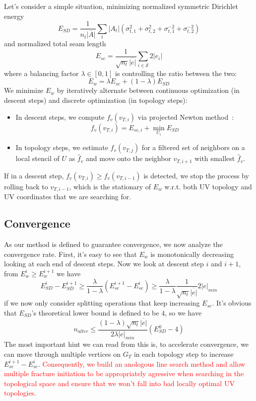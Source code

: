 Let's consider a simple situation, minimizing normalized symmetric Dirichlet energy~\cite{Smith2015Bijective}
\[ E_{SD} = \frac{1}{n_t \overline{|A|}} \sum_t |A_t|(\sigma_{t,1}^2 + \sigma_{t,2}^2 + \sigma_{t,1}^{-2} + \sigma_{t,2}^{-2}) \]
and normalized total seam length
\[ E_{se} = \frac{1}{\sqrt{n_t}\overline{|e|}} \sum_{i \in \mathcal{S}} 2|e_i| \]
where a balancing factor $\lambda \in [0, 1]$ is controlling the ratio between the two: 
\[ E_w = \lambda E_{se} + (1 - \lambda) E_{SD} \]
We minimize $E_w$ by iteratively alternate between continuous optimization (in descent steps) and discrete optimization (in topology steps):
\begin{itemize}
\item In descent steps, we compute $f_v(v_{T,i})$ via projected Newton method~\cite{Teran2005Robust}:
\[ f_v(v_{T,i}) = E_{se,i} + \min_{U_i} E_{SD} \]
\item In topology steps, we estimate $f_v(v_{T,j})$ for a filtered set of neighbors on a local stencil of $U$ as $\hat{f}_v$ and move onto the neighbor $v_{T,i+1}$ with smallest $\hat{f}_v$.
\end{itemize}
If in a descent step, $f_v(v_{T,i}) \geq f_v(v_{T,i-1})$ is detected, we stop the process by rolling back to $v_{T,i-1}$, which is the stationary of $E_w$ w.r.t. both UV topology and UV coordinates that we are searching for.

\subsection{Convergence}

As our method is defined to guarantee convergence, we now analyze the convergence rate. First, it's easy to see that $E_w$ is monotonically decreasing looking at each end of descent steps. Now we look at descent step $i$ and $i+1$, from $E^i_w \geq E^{i+1}_w$ we have
\[ E^i_{SD} - E^{i+1}_{SD} \geq \frac{\lambda}{1-\lambda} (E^{i+1}_{se} - E^i_{se}) \geq \frac{\lambda}{1-\lambda} \frac{1}{\sqrt{n_t}\overline{|e|}} 2|e|_{min} \]
if we now only consider splitting operations that keep increasing $E_{se}$. It's obvious that $E_{SD}$'s theoretical lower bound is defined to be $4$, so we have
\[ n_{alter} \leq \frac{(1-\lambda)\sqrt{n_t}\overline{|e|}}{2\lambda|e|_{min}} (E^0_{SD} - 4) \]
The most important hint we can read from this is, to accelerate convergence, we can move through multiple vertices on $G_T$ in each topology step to increase $E^{i+1}_{se} - E^i_{se}$. \textcolor{red}{Consequently, we build an anologous line search method and allow multiple fracture initiation to be appropriately agressive when searching in the topological space and ensure that we won't fall into bad locally optimal UV topologies.}

